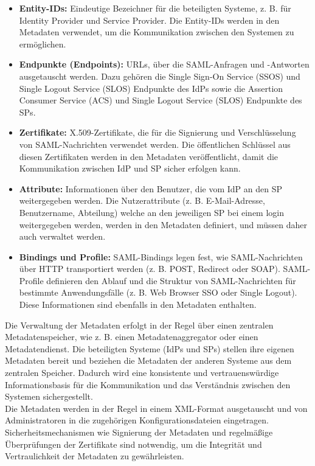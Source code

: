 \documentclass[a4paper, fontsize=11pt]{scrartcl}
\begin{document}
\begin{itemize}
    \item \textbf{Entity-IDs:} Eindeutige Bezeichner für die beteiligten Systeme, z. B. für Identity Provider und Service Provider. Die Entity-IDs werden in den Metadaten verwendet, um die Kommunikation zwischen den Systemen zu ermöglichen.
    \item \textbf{Endpunkte (Endpoints):} URLs, über die SAML-Anfragen und -Antworten ausgetauscht werden. Dazu gehören die Single Sign-On Service (SSOS) und Single Logout Service (SLOS) Endpunkte des IdPs sowie die Assertion Consumer Service (ACS) und Single Logout Service (SLOS) Endpunkte des SPs.
    \item \textbf{Zertifikate:} X.509-Zertifikate, die für die Signierung und Verschlüsselung von SAML-Nachrichten verwendet werden. Die öffentlichen Schlüssel aus diesen Zertifikaten werden in den Metadaten veröffentlicht, damit die Kommunikation zwischen IdP und SP sicher erfolgen kann.
    \item \textbf{Attribute:} Informationen über den Benutzer, die vom IdP an den SP weitergegeben werden. Die Nutzerattribute (z. B. E-Mail-Adresse, Benutzername, Abteilung) welche an den jeweiligen SP bei einem login weitergegeben werden, werden in den Metadaten definiert, und müssen daher auch verwaltet werden.
    \item \textbf{Bindings und Profile:} SAML-Bindings legen fest, wie SAML-Nachrichten über HTTP transportiert werden (z. B. POST, Redirect oder SOAP). SAML-Profile definieren den Ablauf und die Struktur von SAML-Nachrichten für bestimmte Anwendungsfälle (z. B. Web Browser SSO oder Single Logout). Diese Informationen sind ebenfalls in den Metadaten enthalten.
\end{itemize}

Die Verwaltung der Metadaten erfolgt in der Regel über einen zentralen Metadatenspeicher, wie z. B. einen Metadatenaggregator oder einen Metadatendienst. 
Die beteiligten Systeme (IdPs und SPs) stellen ihre eigenen Metadaten bereit und beziehen die Metadaten der anderen Systeme aus dem zentralen Speicher. 
Dadurch wird eine konsistente und vertrauenswürdige Informationsbasis für die Kommunikation und das Verständnis zwischen den Systemen sichergestellt.\\
Die Metadaten werden in der Regel in einem XML-Format ausgetauscht und von Administratoren in die zugehörigen Konfigurationsdateien eingetragen. 
Sicherheitsmechanismen wie Signierung der Metadaten und regelmäßige Überprüfungen der Zertifikate sind notwendig, um die Integrität und Vertraulichkeit der Metadaten zu gewährleisten.
\end{document}

